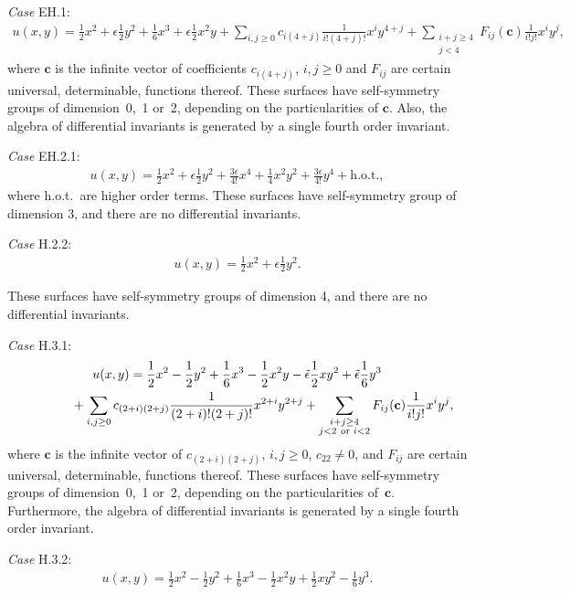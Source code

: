 \documentclass[10pt,a4paper]{amsart}
\numberwithin{equation}{section}
\begin{document}
{\it Case} EH.1:
\begin{gather*}
u(x,y)=\frac{1}{2}x^2+\epsilon\frac{1}{2}y^2+\frac{1}{6}x^3+\epsilon\frac{1}{2}x^2y
+\sum_{i,j\geq 0}c_{i(4+j)}\frac{1}{i!(4+j)!}x^iy^{4+j}
+\sum_{\substack{ i+j\geq 4 \\ j<4}}F_{ij}(\mathbf{c})\frac{1}{i!j!}x^iy^j,
\end{gather*}
where $\mathbf{c}$ is the infinite vector of coefficients $c_{i(4+j)}$, $i,j\geq0$ and $F_{ij}$ are certain universal, determinable, functions thereof. These surfaces have self-symmetry groups of dimension~0,~1 or~2, depending on the particularities of $\mathbf{c}$. Also, the algebra of differential invariants is generated by a single fourth order invariant.

{\it Case} EH.2.1:
\begin{gather*}
u(x,y)=\frac{1}{2}x^2+\epsilon\frac{1}{2}y^2+\frac{3\epsilon}{4!}x^4
+\frac{1}{4}x^2y^2+\frac{3\epsilon}{4!}y^4+ \text{h.o.t.},
\end{gather*}
where h.o.t.\ are higher order terms. These surfaces have self-symmetry group of dimension 3, and there are no differential invariants.

{\it Case} H.2.2:
\begin{gather*}
u(x,y)=\frac{1}{2}x^2+\epsilon\frac{1}{2}y^2.
\end{gather*}

These surfaces have self-symmetry groups of dimension 4, and there are no differential inva\-riants.

{\it Case} H.3.1:
\begin{gather*}
u(x,y)=\frac{1}{2}x^2-\frac{1}{2}y^2+\frac{1}{6}x^3-\frac{1}{2}x^2y -\tilde{\epsilon}\frac{1}{2}xy^2+\tilde{\epsilon}\frac{1}{6}y^3
\\ \hphantom{u(x,y)=}
{}+\sum_{i,j\geq 0}c_{(2+i)(2+j)}\frac{1}{(2+i)!(2+j)!}x^{2+i}y^{2+j}
+\sum_{\substack{ i+j\geq 4 \\ j<2~\text{or } i<2}}F_{ij}(\mathbf{c})\frac{1}{i!j!}x^iy^j,
\end{gather*}
where $\mathbf{c}$ is the infinite vector of $c_{(2+i)(2+j)}$, $i,j\geq0$, $c_{22}\neq0$, and $F_{ij}$ are certain universal, determinable, functions thereof. These surfaces have self-symmetry groups of dimension~0,~1 or~2, depending on the particularities of~$\mathbf{c}$. Furthermore, the algebra of differential invariants is generated by a single fourth order invariant.

{\it Case} H.3.2:
\begin{gather*}
u(x,y)=\frac{1}{2}x^2-\frac{1}{2}y^2+\frac{1}{6}x^3-\frac{1}{2}x^2y+\frac{1}{2}xy^2-\frac{1}{6}y^3.
\end{gather*}
\end{document}
